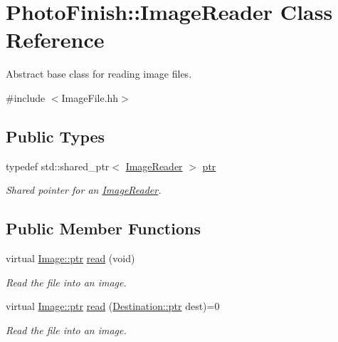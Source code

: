 \hypertarget{class_photo_finish_1_1_image_reader}{}\section{Photo\+Finish\+:\+:Image\+Reader Class Reference}
\label{class_photo_finish_1_1_image_reader}


Abstract base class for reading image files.  




{\ttfamily \#include $<$Image\+File.\+hh$>$}

\subsection*{Public Types}
\begin{DoxyCompactItemize}
\item 
typedef std\+::shared\+\_\+ptr$<$ \hyperlink{class_photo_finish_1_1_image_reader}{Image\+Reader} $>$ \hyperlink{class_photo_finish_1_1_image_reader_a4f077d55ff971217578dc51db00715aa}{ptr}
\begin{DoxyCompactList}\small\item\em Shared pointer for an \hyperlink{class_photo_finish_1_1_image_reader}{Image\+Reader}. \end{DoxyCompactList}\end{DoxyCompactItemize}
\subsection*{Public Member Functions}
\begin{DoxyCompactItemize}
\item 
virtual \hyperlink{class_photo_finish_1_1_image_ab336203305ed3a1397d7245063353b5a}{Image\+::ptr} \hyperlink{class_photo_finish_1_1_image_reader_ad4c4ba4d84800ffe7e3d9f2150fc8ece}{read} (void)
\begin{DoxyCompactList}\small\item\em Read the file into an image. \end{DoxyCompactList}\item 
virtual \hyperlink{class_photo_finish_1_1_image_ab336203305ed3a1397d7245063353b5a}{Image\+::ptr} \hyperlink{class_photo_finish_1_1_image_reader_a2911b61ef1a592e9d384fd4be8699948}{read} (\hyperlink{class_photo_finish_1_1_destination_a0d282a905cd81c3f0e6d7233c9bc7774}{Destination\+::ptr} dest)=0
\begin{DoxyCompactList}\small\item\em Read the file into an image. \end{DoxyCompactList}\end{DoxyCompactItemize}
